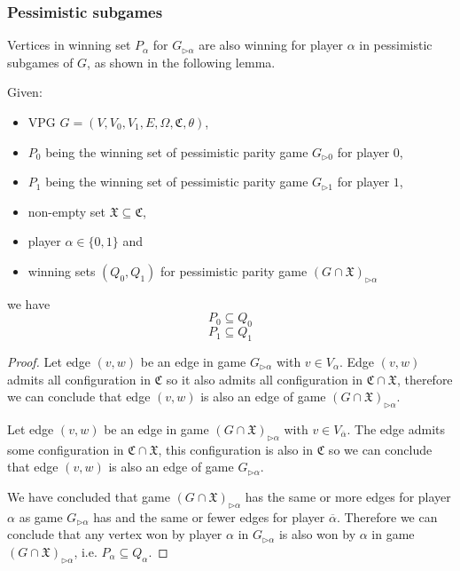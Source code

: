 \subsubsection{Pessimistic subgames}
Vertices in winning set $P_\alpha$ for $G_{\triangleright\alpha}$ are also winning for player $\alpha$ in pessimistic subgames of $G$, as shown in the following lemma.
\begin{lemma}
	\label{lem_pessimistic_subgames}
	Given:
	\begin{itemize}
		\item VPG $G = (V,V_0,V_1,E,\Omega, \mathfrak{C},\theta)$,
		\item $P_0$ being the winning set of pessimistic parity game $G_{\triangleright0}$ for player $0$,
		\item $P_1$ being the winning set of pessimistic parity game $G_{\triangleright1}$ for player $1$,
		\item non-empty set $\mathfrak{X} \subseteq \mathfrak{C}$,
		\item player $\alpha \in \{0,1\}$ and
		\item winning sets $(Q_0,Q_1)$ for pessimistic parity game $(G \cap \mathfrak{X})_{\triangleright\alpha}$
	\end{itemize}
	we have
	\[ P_0 \subseteq Q_0 \]
	\[ P_1 \subseteq Q_1 \]
	\begin{proof}
		
		Let edge $(v,w)$ be an edge in game $G_{\triangleright\alpha}$ with $v \in V_\alpha$. Edge $(v,w)$ admits all configuration in $\mathfrak{C}$ so it also admits all configuration in $\mathfrak{C} \cap \mathfrak{X}$, therefore we can conclude that edge $(v,w)$ is also an edge of game $(G\cap \mathfrak{X})_{\triangleright\alpha}$.
		
		Let edge $(v,w)$ be an edge in game $(G \cap \mathfrak{X})_{\triangleright\alpha}$ with $v \in V_{\overline{\alpha}}$. The edge admits some configuration in $\mathfrak{C} \cap \mathfrak{X}$, this configuration is also in $\mathfrak{C}$ so we can conclude that edge $(v,w)$ is also an edge of game $G_{\triangleright\alpha}$.
		
		We have concluded that game $(G \cap \mathfrak{X})_{\triangleright\alpha}$ has the same or more edges for player $\alpha$ as game $G_{\triangleright\alpha}$ has and the same or fewer edges for player $\overline{\alpha}$. Therefore we can conclude that any vertex won by player $\alpha$ in $G_{\triangleright\alpha}$ is also won by $\alpha$ in game $(G \cap \mathfrak{X})_{\triangleright\alpha}$, i.e. $P_\alpha \subseteq Q_\alpha$.
		

\end{proof}
\end{lemma}
